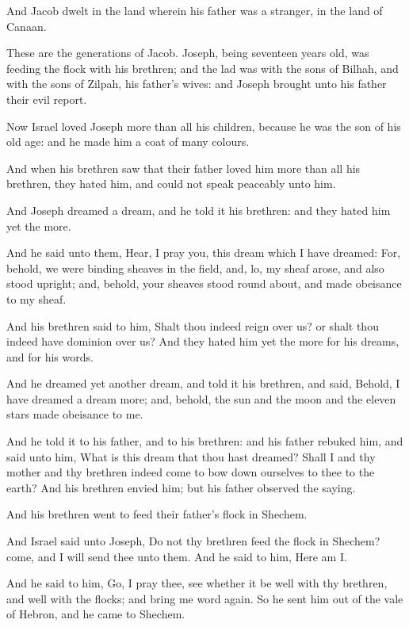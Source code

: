 \Chapter
\Verse And Jacob dwelt in the land wherein his father was a stranger, in the land of Canaan.

\Verse These are the generations of Jacob. Joseph, being seventeen years old, was feeding the flock with his brethren; and the lad was with the sons of Bilhah, and with the sons of Zilpah, his father's wives: and Joseph brought unto his father their evil report.

\Verse Now Israel loved Joseph more than all his children, because he was the son of his old age: and he made him a coat of many colours.

\Verse And when his brethren saw that their father loved him more than all his brethren, they hated him, and could not speak peaceably unto him.

\Verse And Joseph dreamed a dream, and he told it his brethren: and they hated him yet the more.

\Verse And he said unto them, Hear, I pray you, this dream which I have dreamed: \Verse For, behold, we were binding sheaves in the field, and, lo, my sheaf arose, and also stood upright; and, behold, your sheaves stood round about, and made obeisance to my sheaf.

\Verse And his brethren said to him, Shalt thou indeed reign over us? or shalt thou indeed have dominion over us? And they hated him yet the more for his dreams, and for his words.

\Verse And he dreamed yet another dream, and told it his brethren, and said, Behold, I have dreamed a dream more; and, behold, the sun and the moon and the eleven stars made obeisance to me.

\Verse And he told it to his father, and to his brethren: and his father rebuked him, and said unto him, What is this dream that thou hast dreamed?  Shall I and thy mother and thy brethren indeed come to bow down ourselves to thee to the earth?  \Verse And his brethren envied him; but his father observed the saying.

\Verse And his brethren went to feed their father's flock in Shechem.

\Verse And Israel said unto Joseph, Do not thy brethren feed the flock in Shechem? come, and I will send thee unto them. And he said to him, Here am I.

\Verse And he said to him, Go, I pray thee, see whether it be well with thy brethren, and well with the flocks; and bring me word again. So he sent him out of the vale of Hebron, and he came to Shechem.

